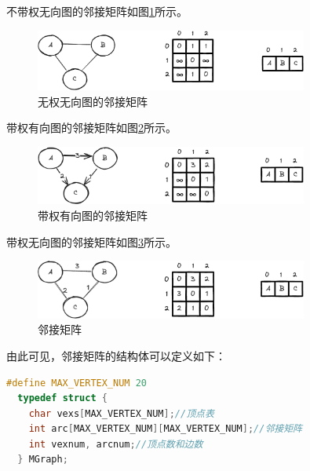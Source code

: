 \documentclass[lang=cn,newtx,10pt,scheme=chinese]{../elegantbook}
\begin{document}
不带权无向图的邻接矩阵如图\ref{fig:adjacencyMatrix_UnWeightUndirected}所示。

\begin{figure}[!htbp]
  \centering
  \includegraphics[width=0.8\textwidth]{./figure/pdf/cropped/adjacencyMatrix_UnWeightUndirected.pdf}
  \caption{无权无向图的邻接矩阵}
  \label{fig:adjacencyMatrix_UnWeightUndirected}
\end{figure}

带权有向图的邻接矩阵如图\ref{fig:adjacencyMatrix_WeightedDirected}所示。

\begin{figure}[!htbp]
  \centering
  \includegraphics[width=0.8\textwidth]{./figure/pdf/cropped/adjacencyMatrix_weightDirected.pdf}
  \caption{带权有向图的邻接矩阵}
  \label{fig:adjacencyMatrix_WeightedDirected}
\end{figure}


带权无向图的邻接矩阵如图\ref{fig:adjacencyMatrix_WeightedUndirected}所示。
\begin{figure}[!htbp]
  \centering
  \includegraphics[width=0.8\textwidth]{./figure/pdf/cropped/adjacencyMatrix_weightUnDirected.pdf}
  \caption{邻接矩阵}
  \label{fig:adjacencyMatrix_WeightedUndirected}
\end{figure}

由此可见，邻接矩阵的结构体可以定义如下：

\begin{lstlisting}[language=C++, caption={邻接矩阵结构体}]
  #define MAX_VERTEX_NUM 20
  typedef struct {
    char vexs[MAX_VERTEX_NUM];//顶点表
    int arc[MAX_VERTEX_NUM][MAX_VERTEX_NUM];//邻接矩阵
    int vexnum, arcnum;//顶点数和边数
  } MGraph;
\end{lstlisting}
\end{document}
